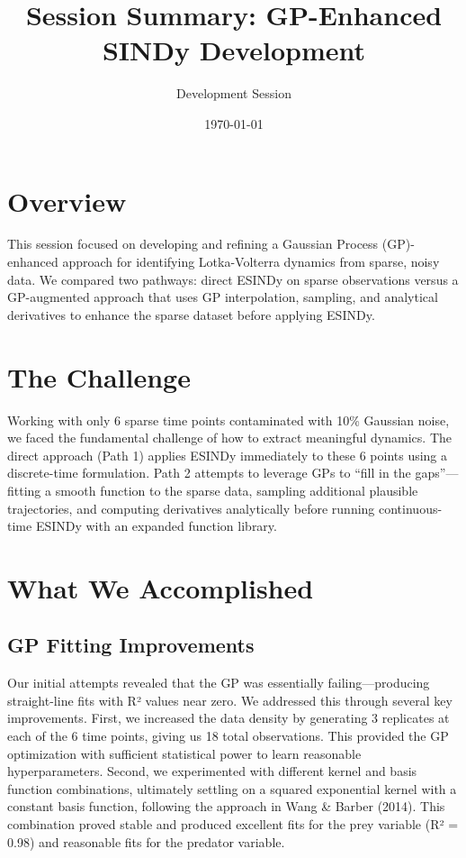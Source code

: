 \documentclass[11pt]{article}
\title{Session Summary: GP-Enhanced SINDy Development}
\author{Development Session}
\date{\today}
\begin{document}
\maketitle

\section{Overview}

This session focused on developing and refining a Gaussian Process (GP)-enhanced approach for identifying Lotka-Volterra dynamics from sparse, noisy data. We compared two pathways: direct ESINDy on sparse observations versus a GP-augmented approach that uses GP interpolation, sampling, and analytical derivatives to enhance the sparse dataset before applying ESINDy.

\section{The Challenge}

Working with only 6 sparse time points contaminated with 10\% Gaussian noise, we faced the fundamental challenge of how to extract meaningful dynamics. The direct approach (Path 1) applies ESINDy immediately to these 6 points using a discrete-time formulation. Path 2 attempts to leverage GPs to ``fill in the gaps''---fitting a smooth function to the sparse data, sampling additional plausible trajectories, and computing derivatives analytically before running continuous-time ESINDy with an expanded function library.

\section{What We Accomplished}

\subsection{GP Fitting Improvements}

Our initial attempts revealed that the GP was essentially failing---producing straight-line fits with R² values near zero. We addressed this through several key improvements. First, we increased the data density by generating 3 replicates at each of the 6 time points, giving us 18 total observations. This provided the GP optimization with sufficient statistical power to learn reasonable hyperparameters. Second, we experimented with different kernel and basis function combinations, ultimately settling on a squared exponential kernel with a constant basis function, following the approach in Wang \& Barber (2014). This combination proved stable and produced excellent fits for the prey variable (R² = 0.98) and reasonable fits for the predator variable.
\end{document}
